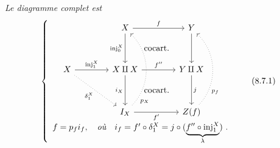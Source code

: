 \textit{Le diagramme complet est}
\[
\left\{
\begin{array}{c}
\begin{tikzcd}[ampersand replacement=\&,column sep=4em,row sep=3.5em]
 \& X \arrow[r, "f"] \arrow[d, "\mathrm{inj}_0^X"'] \arrow[dr, phantom, "\text{cocart.}"] \& Y \arrow[d] \\
X \arrow[r, "\mathrm{inj}_1^X"] \arrow[dr, dotted, "\delta_1^X"'] \& X \amalg X \arrow[r, "f''"] \arrow[d, "i_X"'] \arrow[dr, phantom, "\text{cocart.}"] \& Y \amalg X \arrow[d, "j"] \\
 \& I_X \arrow[r, "f'"'] \arrow[uu, dotted, bend right=45, "p_X"{pos=.12,swap}] \& Z(f) \arrow[uu, dotted, bend right=45, "p_f"{pos=.25,swap}]
\end{tikzcd}
\\[1ex]
f = p_f i_f, \quad \textit{où} \quad i_f = f' \circ \delta_1^X = j \circ (\underbrace{f'' \circ \mathrm{inj}_1^X}_{\lambda})\ .
\end{array}
\right.
\tag*{(8.7.1)}
\]


